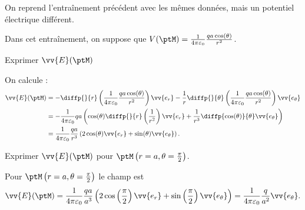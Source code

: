 On reprend l'entraînement précédent avec les mêmes données, mais un potentiel électrique différent. 

Dans cet entraînement, on suppose que $V(\ptM) = \frac{1}{4\pi\varepsilon_0} \frac{qa\cos (\theta)}{r^2}$.

\debutEntrainement

\begin{enonce}
	Exprimer $\vv{E}(\ptM)$
\end{enonce}


\begin{corrige}
On calcule :
	\begin{align*}
		\vv{E}(\ptM) &= -\diffp{}{r} \left(  \frac{1}{4\pi\varepsilon_0}\frac{qa\cos (\theta) }{r^2} \right)  \vv{e_{r}} - \frac{1}{r}\diffp{}{\theta} \left(  \frac{1}{4\pi\varepsilon_0}\frac{qa\cos (\theta) }{r^2} \right)  \vv{e_{\theta}}\\
		&= -\frac{1}{4\pi\varepsilon_0}qa \left( \cos (\theta) \diffp{}{r}\left( \frac{1}{r^2}\right)\vv{e_{r}} + \frac{1}{r^3}\diffp{\cos (\theta)}{\theta}\vv{e_{\theta}}  \right)\\
		&= \frac{1}{4\pi\varepsilon_0}\frac{qa}{r^3} \left( 2\cos(\theta) \vv{e_{r}} + \sin (\theta) \vv{e_{\theta}} \right).
	\end{align*}
\end{corrige}

\begin{enonce}
	Exprimer $\vv{E}(\ptM)$ pour $\ptM\left(r=a,\theta=\frac{\pi}{2}\right)$.
\end{enonce}


\begin{corrige}
	Pour $\ptM\left(r=a,\theta=\frac{\pi}{2}\right)$ le champ est
	\[
		\vv{E}(\ptM) = \frac{1}{4\pi\varepsilon_0} \frac{qa}{a^3} \left( 2\cos\left(\frac{\pi}{2}\right) \vv{e_{r}} +  \sin\left( \frac{\pi}{2}\right) \vv{e_{\theta}} \right) = \frac{1}{4\pi\varepsilon_0} \frac{q}{a^2} \vv{e_{\theta}}.
	\]
\end{corrige}

